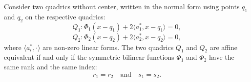 Consider two quadrics without center, written in the normal form using points $q_1$ and $q_2$ on the respective quadrics:
$$Q_1: \Phi_1(x - q_1) + 2\langle a_1^*, x - q_1 \rangle = 0,$$
$$Q_2: \Phi_2(x - q_2) + 2\langle a_2^*, x - q_2 \rangle = 0,$$
where $\langle a_i^*, \cdot \rangle$ are non-zero linear forms. The two quadrics $Q_1$ and $Q_2$ are affine equivalent if and only if the symmetric bilinear functions $\Phi_1$ and $\Phi_2$ have the same rank and the same index:
$$r_1 = r_2 \quad \text{and} \quad s_1 = s_2.$$
